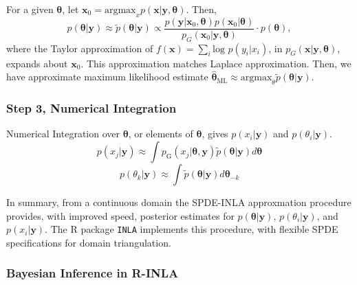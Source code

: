 For a given $\pmb{\theta}$, let $\pmb{x}_{0} = \text{argmax}_{x}p(\pmb{x}|\pmb{y},\pmb{\theta})$. Then,
$$ p(\pmb{\theta}|\pmb{y}) \approx \tilde{p}(\pmb{\theta}|\pmb{y}) \propto  \frac{p(\pmb{y} | \pmb{x}_{0}, \pmb{\theta}) p(\pmb{x}_{0} | \pmb{\theta})}{p_{G}(\pmb{x}_{0} | \pmb{y}, \pmb{\theta})} \cdot p(\pmb{\theta}),$$
where the Taylor approximation of $f(\pmb{x}) = \sum_{i} \text{log }p(y_{i}|x_{i})$, in $p_{G}(\pmb{x} | \pmb{y}, \pmb{\theta})$, expands about $\pmb{x}_{0}$. This approximation matches \cite{Tierney1986} Laplace approximation.  Then, we have approximate maximum likelihood estimate $\hat{\pmb{\theta}}_{\text{ML}} \approx \text{argmax}_{\theta} \tilde{p}(\pmb{\theta}|\pmb{y})$.

\subsubsection*{Step 3, Numerical Integration} %
Numerical Integration over $\pmb{\theta}$, or elements of $\pmb{\theta}$, gives $p(x_{i}|\pmb{y})$ and $p(\theta_{i}|\pmb{y})$.
        $$ p(x_{j} | \pmb{y}) \approx \int p_{\text{G}}(x_{j}|\pmb{\theta, y})\tilde{p}(\pmb{\theta}|\pmb{y}) d\pmb{\theta} $$
        $$ p(\theta_{k} | \pmb{y}) \approx \int \tilde{p}(\pmb{\theta}|\pmb{y}) d\pmb{\theta}_{-k} $$

In summary, from a continuous domain the SPDE-INLA approxmation procedure provides, with improved speed, posterior estimates for $p(\pmb{\theta}|\pmb{y})$, $p(\theta_{i}|\pmb{y})$, and $p(x_{i}|\pmb{y})$. The R package \verb|INLA| implements this procedure, with flexible SPDE specifications for domain triangulation.

\subsubsection{Bayesian Inference in R-INLA}

% 
% 
% 